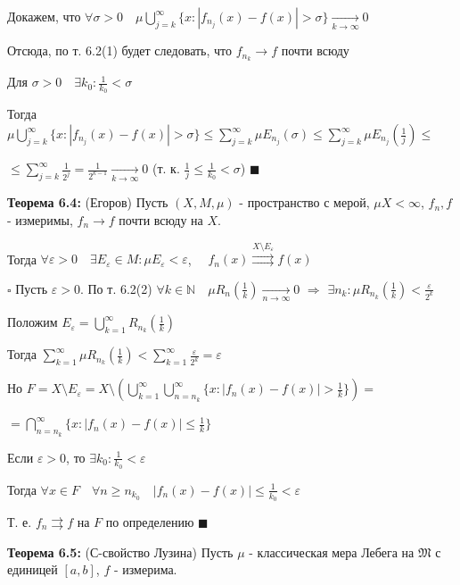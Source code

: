 \documentclass[a4paper]{report}
\begin{document}
Докажем, что $\forall\sigma>0\quad\mu\bigcup\limits_{j=k}^\infty\{x\colon|f_{n_j}(x)-f(x)|>\sigma\}\xrightarrow[k\to\infty]{}0$

Отсюда, по т. 6.2(1) будет следовать, что $f_{n_k}\to f$ почти всюду

Для $\sigma>0\quad\exists k_0\colon\displaystyle\frac{1}{k_0}<\sigma$

Тогда $\mu\bigcup\limits_{j=k}^\infty\{x\colon|f_{n_j}(x)-f(x)|>\sigma\}\le\sum\limits_{j=k}^\infty\mu E_{n_j}(\sigma)\le\sum\limits_{j=k}^\infty\mu E_{n_j}
(\frac1j)\le$

$\le\sum\limits_{j=k}^\infty\displaystyle\frac{1}{2^j}=\displaystyle\frac{1}{2^{k-1}}\xrightarrow[k\to\infty]{}0$ (т. к. $\displaystyle\frac1j\le \displaystyle\frac{1}{k_0}<\sigma$) $\blacksquare$
\bigskip

\noindent\textbf{Теорема 6.4:} (Егоров) Пусть $(X,M,\mu)$ - пространство с мерой, $\mu X<\infty$, $f_n,f$ - измеримы, $f_n\to f$ почти всюду на $X$. 

Тогда $\forall\varepsilon>0\quad\exists E_\varepsilon\in M\colon\mu E_\varepsilon<\varepsilon$, $\quad f_n(x)\stackrel{X\setminus E_\varepsilon}{\rightrightarrows}f(x)$

\noindent $\square$ Пусть $\varepsilon>0$. По т. 6.2(2) $\forall k\in\mathbb N\quad\mu R_n(\frac1k)\xrightarrow[n\to\infty]{}0$ $\Rightarrow$ $\exists n_k\colon
\mu R_{n_k}(\frac1k)<\displaystyle\frac{\varepsilon}{2^k}$

Положим $E_\varepsilon=\bigcup\limits_{k=1}^\infty R_{n_k}(\frac1k)$

Тогда $\sum\limits_{k=1}^\infty\mu R_{n_k}(\frac1k)<\sum\limits_{k=1}^\infty\displaystyle\frac{\varepsilon}{2^k}=\varepsilon$

Но $F=X\setminus E_\varepsilon=X\setminus\left(\bigcup\limits_{k=1}^\infty\bigcup\limits_{n=n_k}^\infty\{x\colon|f_n(x)-f(x)|>\frac1k\}\right)=$

$=\bigcap\limits_{n=n_k}^\infty\{x\colon|f_n(x)-f(x)|\le\frac1k\}$

Если $\varepsilon>0$, то $\exists k_0\colon\displaystyle\frac{1}{k_0}<\varepsilon$

Тогда $\forall x\in F\quad\forall n\ge n_{k_0}\quad|f_n(x)-f(x)|\le\displaystyle\frac{1}{k_0}<\varepsilon$

Т. е. $f_n\rightrightarrows f$ на $F$ по определению $\blacksquare$
\bigskip

\noindent\textbf{Теорема 6.5:} (С-свойство Лузина) Пусть $\mu$ - классическая мера Лебега на $\mathfrak M$ с единицей $[a,b]$, $f$ - измерима. 
\end{document}
